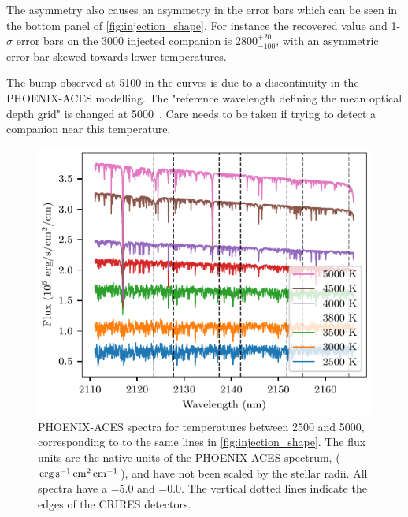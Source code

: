 The asymmetry also causes an asymmetry in the \textchisquared{} error bars which can be seen in the bottom panel of \cref{fig:injection_shape}.
For instance the recovered value and 1-\(\sigma\) error bars on the 3000\K{} injected companion is \(2800 ^{+20}_{-100}\), with an asymmetric error bar skewed towards lower temperatures.

The bump observed at 5100\K{} in the \textchisquared{} curves is due to a discontinuity in the {PHOENIX-ACES} modelling.
The "reference wavelength defining the mean optical depth grid" is changed at 5000\K{}~\citep[][Section~2.3]{husser_new_2013}.
Care needs to be taken if trying to detect a companion near this temperature.

\begin{figure}
    \centering
    \includegraphics[width=\hsize]{./figures/companion_recovery/companion_spectra.pdf}
    \caption{{PHOENIX-ACES} spectra for temperatures between 2500 and 5000\K{}, corresponding to to the same lines in \cref{fig:injection_shape}.
The flux units are the native units of the {PHOENIX-ACES} spectrum, (\(\rm erg\,s^{-1}\,cm^{2}\,cm^{-1}\)), and have not been scaled by the stellar radii.
All spectra have a \Logg{}=5.0 and \feh{}=0.0.
The vertical dotted lines indicate the edges of the CRIRES detectors.}
    \label{fig:comp_spectra}
\end{figure}

